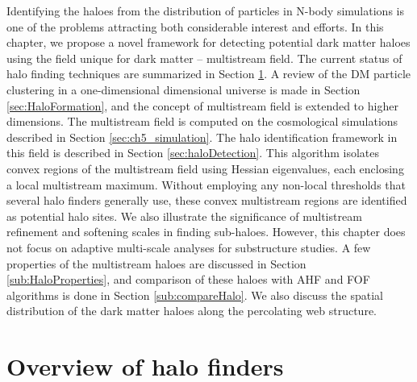 Identifying the haloes from the distribution of particles in N-body simulations is one of the problems attracting both considerable interest and efforts. In this chapter, we propose a novel framework for detecting potential dark matter haloes using the field unique for dark matter  -- multistream field. The current status of halo finding techniques are summarized in Section \ref{sec:5intro}. A review of the DM particle clustering in a one-dimensional dimensional universe is made in Section \ref{sec:HaloFormation}, and the concept of multistream field is extended to higher dimensions. The multistream field is computed on the cosmological simulations described in Section \ref{sec:ch5_simulation}. The halo identification framework in this field is described in Section \ref{sec:haloDetection}. This algorithm isolates convex regions of the multistream field using Hessian eigenvalues, each enclosing a local multistream maximum. Without employing any non-local thresholds that several halo finders generally use, these convex multistream regions are identified as potential halo sites. We also illustrate the significance of multistream refinement and softening scales in finding sub-haloes. However, this chapter does not focus on adaptive multi-scale analyses for substructure studies. A few properties of the multistream haloes are discussed in Section \ref{sub:HaloProperties}, and comparison of these haloes with AHF and FOF algorithms is done in Section \ref{sub:compareHalo}. We also discuss the spatial distribution of the dark matter haloes along the percolating web structure.


\section{Overview of halo finders} 
\label{sec:5intro}

